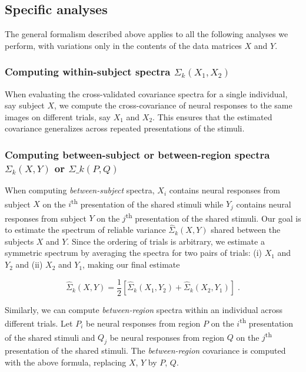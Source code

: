 \documentclass[10pt]{article}
\begin{document}
\subsection{Specific analyses}\label{specific-analyses}

The general formalism described above applies to all the following analyses we perform, with variations only in the contents of the data matrices \(X\) and \(Y\).

\subsubsection{\texorpdfstring{Computing within-subject spectra \(\Sigma_k(X_1, X_2)\)}{Computing within-subject spectra \textbackslash Sigma\_k(X\_1, X\_2)}}\label{computing-within-subject-spectra-sigma_kx_1-x_2}

When evaluating the cross-validated covariance spectra for a single individual, say subject \(X\), we compute the cross-covariance of neural responses to the same images on different trials, say \(X_1\) and \(X_2\). This ensures that the estimated covariance generalizes across repeated presentations of the stimuli.

\subsubsection{\texorpdfstring{Computing between-subject or between-region spectra \(\Sigma_k(X, Y)\) or \(\Sigma\_k(P, Q)\)}{Computing between-subject or between-region spectra \textbackslash Sigma\_k(X, Y) or \textbackslash Sigma\textbackslash\_k(P, Q)}}\label{computing-between-subject-or-between-region-spectra-sigma_kx-y-or-sigma_kp-q}

When computing \emph{between-subject} spectra, \(X_i\) contains neural responses from subject \(X\) on the \(i\)\textsuperscript{th} presentation of the shared stimuli while \(Y_j\) contains neural responses from subject \(Y\) on the \(j\)\textsuperscript{th} presentation of the shared stimuli. Our goal is to estimate the spectrum of reliable variance \(\hat{\Sigma}_k(X, Y)\) shared between the subjects \(X\) and \(Y\). Since the ordering of trials is arbitrary, we estimate a symmetric spectrum by averaging the spectra for two pairs of trials: (i) \(X_1\) and \(Y_2\) and (ii) \(X_2\) and \(Y_1\), making our final estimate

\[
\hat{\Sigma}_k(X, Y) = \frac{1}{2}\left[\hat{\Sigma}_k(X_1, Y_2) + \hat{\Sigma}_k(X_2, Y_1)\right]\;.
\]

Similarly, we can compute \emph{between-region} spectra within an individual across different trials. Let \(P_i\) be neural responses from region \(P\) on the \(i\)\textsuperscript{th} presentation of the shared stimuli and \(Q_j\) be neural responses from region \(Q\) on the \(j\)\textsuperscript{th} presentation of the shared stimuli. The \emph{between-region} covariance is computed with the above formula, replacing \(X\), \(Y\) by \(P\), \(Q\).
\end{document}
